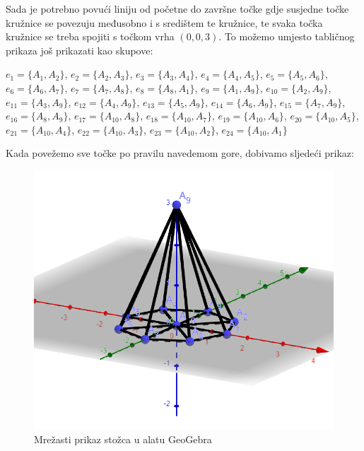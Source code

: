 \documentclass[a4paper,12pt]{article}
\begin{document}
Sada je potrebno povući liniju od početne do završne točke gdje susjedne točke kružnice se povezuju međusobno i s središtem te kružnice,
te svaka točka kružnice se treba spojiti s točkom vrha $(0,0,3)$. To možemo umjesto tabličnog prikaza još prikazati kao skupove:
    
\begin{flushleft}
    $e_1 = \{A_{1},A_{2} \}$, 
    $e_2 = \{A_{2},A_{3} \}$, 
    $e_3 = \{A_{3},A_{4} \}$, 
    $e_4 = \{A_{4},A_{5} \}$, 
    $e_5 = \{A_{5},A_{6} \}$, 
    $e_6 = \{A_{6},A_{7} \}$, 
    $e_7 = \{A_{7},A_{8} \}$, 
    $e_8 = \{A_{8},A_{1} \}$, 
    $e_9 = \{A_{1},A_{9} \}$, 
    $e_{10} = \{A_{2},A_{9} \}$, 
    $e_{11} = \{A_{3},A_{9} \}$, 
    $e_{12} = \{A_{4},A_{9} \}$, 
    $e_{13} = \{A_{5},A_{9} \}$, 
    $e_{14} = \{A_{6},A_{9} \}$, 
    $e_{15} = \{A_{7},A_{9} \}$, 
    $e_{16} = \{A_{8},A_{9} \}$, 
    $e_{17} = \{A_{10},A_{8} \}$, 
    $e_{18} = \{A_{10},A_{7} \}$, 
    $e_{19} = \{A_{10},A_{6} \}$, 
    $e_{20} = \{A_{10},A_{5} \}$, 
    $e_{21} = \{A_{10},A_{4} \}$, 
    $e_{22} = \{A_{10},A_{3} \}$, 
    $e_{23} = \{A_{10},A_{2} \}$, 
    $e_{24} = \{A_{10},A_{1} \}$
    \end{flushleft}
    \clearpage
    Kada povežemo sve točke po pravilu navedemom gore, dobivamo sljedeći prikaz:
    
    \begin{figure}[ht]
        \centering
        \includegraphics[scale=1]{image/zadatak2_stozac_geo.png}
        \caption{Mrežasti prikaz stožca u alatu GeoGebra}
        
    \end{figure}
    
\end{document}
